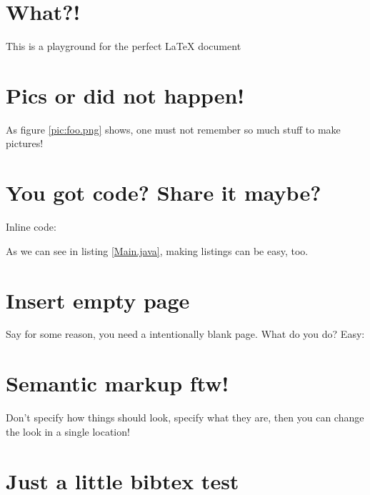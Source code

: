 






\tableofcontents

\chapter{What?!}

This is a playground for the perfect\texttrademark{} \LaTeX{} document

\chapter{Pics or did not happen!}

As figure \ref{pic:foo.png} shows, one must not remember so much stuff to make pictures!



\chapter{You got code? Share it maybe?}

Inline code: 

As we can see in listing \ref{Main.java}, making listings can be easy, too.


\chapter{Insert empty page}

Say for some reason, you need a intentionally blank page. What do you do? Easy:

\insertEmptyPage

\chapter{Semantic markup ftw!}

Don't specify how things should look, specify what they are, then you can change the look in a single location!



\chapter{Just a little bibtex test}

\blindtext~\cite{SomeRef}





